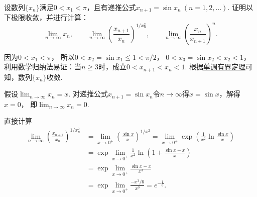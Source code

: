 
\begin{example}
设数列\(\{x_n\}\)满足\(0<x_1<\pi\)，且有递推公式\(x_{n+1}=\sin x_n\ (n=1,2,\dotsc)\).
证明以下极限收敛，并进行计算：\[
	\lim_{n\to\infty} x_n,
	\qquad
	\lim_{n\to\infty} \left(\frac{x_{n+1}}{x_n}\right)^{1/x_n^2},
	\qquad
	\lim_{n\to\infty} \left(\frac{x_n}{x_{n+1}}\right)^n.
\]
\begin{solution}
因为\(0<x_1<\pi\)，
所以\(0<x_2=\sin x_1\leq1<\pi/2\)，
\(0<x_3=\sin x_2<x_2<1\)，
利用数学归纳法易证：当\(n\geq3\)时，成立\(0<x_{n+1}<x_n<1\).
根据\hyperref[theorem:极限.数列的单调有界定理]{单调有界定理}可知，数列\(\{x_n\}\)收敛.

假设\(\lim_{n\to\infty} x_n = x\).
对递推公式\(x_{n+1}=\sin x_n\)令\(n\to\infty\)得\(x=\sin x\)，解得\(x=0\)，
即\(\lim_{n\to\infty} x_n = 0\).

直接计算\begin{align*}
	\lim_{n\to\infty} \left(\frac{x_{n+1}}{x_n}\right)^{1/x_n^2}
	&= \lim_{x\to0^+} \left(\frac{\sin x}{x}\right)^{1/x^2}
	= \lim_{x\to0^+} \exp\left(\frac1{x^2}\ln\frac{\sin x}{x}\right) \\
	&= \exp\lim_{x\to0^+} \frac1{x^2} \ln\left(1+\frac{\sin x-x}{x}\right) \\
	&= \exp\lim_{x\to0^+} \frac{\sin x-x}{x^3} \\
	&= \exp\lim_{x\to0^+} \frac{-x^3/6}{x^3}
	= e^{-\frac16}.
\end{align*}


\end{solution}
\end{example}
